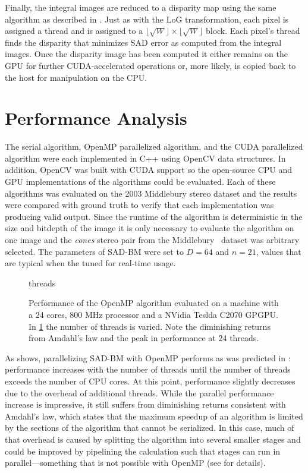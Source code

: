 \documentclass{article}
\newcommand{\floor}[1]{\lfloor#1\rfloor}
\begin{document}
Finally, the integral images are reduced to a disparity map using the same
algorithm as described in . Just as with the LoG transformation,
each pixel is assigned a thread and is assigned to a $\floor{\sqrt{W}} \times
\floor{\sqrt{W}}$ block. Each pixel's thread finds the disparity that minimizes
SAD error as computed from the integral images. Once the disparity image has
been computed it either remains on the GPU for further CUDA-accelerated
operations or, more likely, is copied back to the host for manipulation on the
CPU.

\section{Performance Analysis}
\label{sec:perf}
The serial algorithm, OpenMP parallelized algorithm, and the CUDA parallelized
algorithm were each implemented in C++ using OpenCV data structures. In
addition, OpenCV was built with CUDA support so the open-source CPU and GPU
implementations of the algorithms could be evaluated. Each of these algorithms
was evaluated on the 2003 Middlebury stereo dataset and the results were
compared with ground truth to verify that each implementation was producing
valid output. Since the runtime of the algorithm is deterministic in the size
and bitdepth of the image it is only necessary to evaluate the algorithm on one
image and the \textit{cones} stereo pair from the
Middlebury~\cite{scharstein2003} dataset was arbitrary selected. The parameters
of SAD-BM were set to $D = 64$ and $n = 21$, values that are typical when the
tuned for real-time usage.

\begin{figure}
    \centering
    {threads}
    \caption{
        Performance of the OpenMP algorithm evaluated on a machine with a 24
        cores, 800 MHz processor and a NVidia Teslda C2070 GPGPU. In
        \ref{fig:perf-omp} the number of threads is varied. Note the
        diminishing returns from Amdahl's law and the peak in performance at 24
        threads.
    }
    \label{fig:perf-omp}
\end{figure}

As  shows, parallelizing SAD-BM with OpenMP performs as was
predicted in : performance increases with the number of
threads until the number of threads exceeds the number of CPU cores. At this
point, performance slightly decreases due to the overhead of additional
threads.  While the parallel performance increase is impressive, it still
suffers from diminishing returns consistent with Amdahl's law, which states
that the maximum speedup of an algorithm is limited by the sections of the
algorithm that cannot be serialized. In this case, much of that overhead is
caused by splitting the algorithm into several smaller stages and could be
improved by pipelining the calculation such that stages can run in
parallel---something that is not possible with OpenMP (see 
for details).
\end{document}
